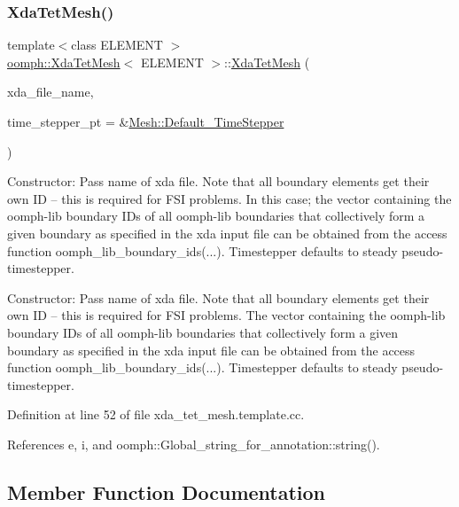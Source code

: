 \subsubsection{\texorpdfstring{Xda\+Tet\+Mesh()}{XdaTetMesh()}}
{\footnotesize\ttfamily template$<$class E\+L\+E\+M\+E\+NT $>$ \\
\hyperlink{classoomph_1_1XdaTetMesh}{oomph\+::\+Xda\+Tet\+Mesh}$<$ E\+L\+E\+M\+E\+NT $>$\+::\hyperlink{classoomph_1_1XdaTetMesh}{Xda\+Tet\+Mesh} (\begin{DoxyParamCaption}\item[{const std\+::string}]{xda\+\_\+file\+\_\+name,  }\item[{\hyperlink{classoomph_1_1TimeStepper}{Time\+Stepper} $\ast$}]{time\+\_\+stepper\+\_\+pt = {\ttfamily \&\hyperlink{classoomph_1_1Mesh_a12243d0fee2b1fcee729ee5a4777ea10}{Mesh\+::\+Default\+\_\+\+Time\+Stepper}} }\end{DoxyParamCaption})}



Constructor\+: Pass name of xda file. Note that all boundary elements get their own ID -- this is required for F\+SI problems. In this case; the vector containing the oomph-\/lib boundary I\+Ds of all oomph-\/lib boundaries that collectively form a given boundary as specified in the xda input file can be obtained from the access function oomph\+\_\+lib\+\_\+boundary\+\_\+ids(...). Timestepper defaults to steady pseudo-\/timestepper. 

Constructor\+: Pass name of xda file. Note that all boundary elements get their own ID -- this is required for F\+SI problems. The vector containing the oomph-\/lib boundary I\+Ds of all oomph-\/lib boundaries that collectively form a given boundary as specified in the xda input file can be obtained from the access function oomph\+\_\+lib\+\_\+boundary\+\_\+ids(...). Timestepper defaults to steady pseudo-\/timestepper. 

Definition at line 52 of file xda\+\_\+tet\+\_\+mesh.\+template.\+cc.



References e, i, and oomph\+::\+Global\+\_\+string\+\_\+for\+\_\+annotation\+::string().



\subsection{Member Function Documentation}
\mbox{\label{classoomph_1_1XdaTetMesh_ad81712bc6c7215d64494ccafc8c99dd5}} 
